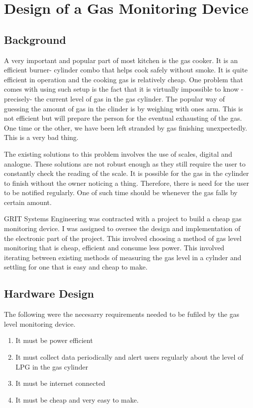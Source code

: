 
\section{Design of a Gas Monitoring Device} 
\subsection{Background}
A very important and popular part of most kitchen is the gas cooker. It is an efficient burner- cylinder combo that helps cook safely without smoke. It is quite efficient in operation and the cooking gas is relatively cheap. One problem that comes with using such setup is the fact that it is virtually impossible to know -precisely- the current level of gas in the gas cylinder. The popular way of guessing the amount of gas in the clinder is by weighing with ones arm. This is not efficient but will prepare the person for the eventual exhausting of the gas. One time or the other, we have been left stranded by gas finishing unexpectedly. This is a very bad thing.

The existing solutions to this problem involves the use of scales, digital and analogue. These solutions are not robust enough as they still require the user to constantly check the reading of the scale. It is possible for the gas in the cylinder to finish without the owner noticing a thing. Therefore, there is need for the user to be notified regularly. One of such time should be whenever the gas falls by certain amount. 

GRIT Systems Engineering was contracted with a project to build a cheap gas monitoring device. I was assigned to oversee the design and implementation of the electronic part of the project. This involved choosing a method of gas level monitoring that is cheap, efficient and consume less power. This involved iterating between existing methods of measuring the gas level in a cylnder and settling for one that is easy and cheap to make.


\subsection{Hardware Design}
The following were the necesarry requirements needed to be fufiled by the gas level monitoring device.
\begin{enumerate}
\item It must be power efficient
\item It must collect data periodically and alert users regularly about the level of LPG in the gas cylinder
\item It must be internet connected 
\item It must be cheap and very easy to make.
\end{enumerate}

